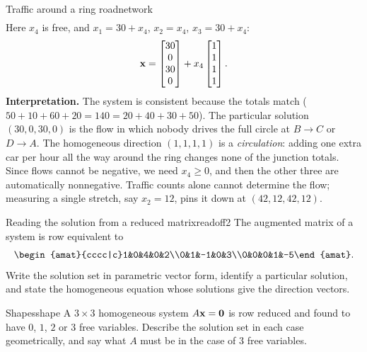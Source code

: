 \documentclass[11pt]{article}
\begin{document}
\begin{exmp}{Traffic around a ring road}{network}
\begin{align*}
\end{align*}
Here $x_4$ is free, and $x_1=30+x_4$, $x_2=x_4$, $x_3=30+x_4$:
\[
\mathbf{x}=\begin{bmatrix}30\\0\\30\\0\end{bmatrix}+x_4\begin{bmatrix}1\\1\\1\\1\end{bmatrix}.
\]
\textbf{Interpretation.} The system is consistent because the totals match ($50+10+60+20=140=20+40+30+50$). The particular solution $(30,0,30,0)$ is the flow in which nobody drives the full circle at $B\to C$ or $D\to A$.
The homogeneous direction $(1,1,1,1)$ is a \emph{circulation}: adding one extra car per hour all the way around the ring changes none of the junction totals. Since flows cannot be negative, we need $x_4\ge0$, and then the other three are automatically nonnegative. Traffic counts alone cannot determine the flow; measuring a single stretch, say $x_2=12$, pins it down at $(42,12,42,12)$.
\end{exmp}

\begin{kc}{Reading the solution from a reduced matrix}{readoff2}
The augmented matrix of a system is row equivalent to
\[
\begin{amat}{cccc|c}1&0&4&0&2\\0&1&-1&0&3\\0&0&0&1&-5\end{amat}.
\]
Write the solution set in parametric vector form, identify a particular solution, and state the homogeneous equation whose solutions give the direction vectors.
\end{kc}

\begin{kc}{Shapes}{shape}
A $3\times3$ homogeneous system $A\mathbf{x}=\mathbf{0}$ is row reduced and found to have $0$, $1$, $2$ or $3$ free variables. Describe the solution set in each case geometrically, and say what $A$ must be in the case of $3$ free variables.
\end{kc}
\end{document}
